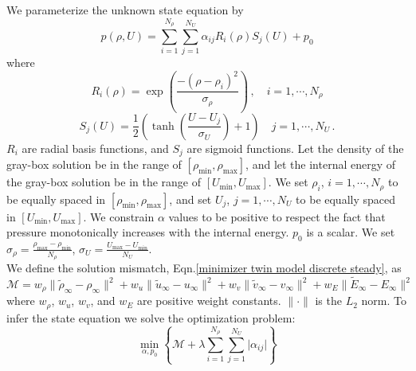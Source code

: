 \documentclass[a4paper,onecolumn]{article}
\theoremstyle{remark}
\begin{document}
\indent We parameterize the unknown state equation by
\begin{equation}
    p(\rho, U) = \sum_{i=1}^{N_\rho} \sum_{j=1}^{N_U} \alpha_{ij} R_i(\rho) S_j(U) 
    + p_0
    \label{parameterization}
\end{equation}
where
\begin{equation}
    R_i(\rho) = \exp\left(\frac{-(\rho-\rho_i)^2}{\sigma_\rho}\right)\,,\quad i=1,\cdots,N_\rho 
\end{equation}
\begin{equation}
    S_j(U) = \frac{1}{2}\left(\tanh\left( \frac{U-U_j}{\sigma_U}\right) +1\right)
    \quad j = 1,\cdots,N_U\,.
\end{equation}
$R_i$ are radial basis functions, and $S_j$ are sigmoid functions.
Let the density of the gray-box solution be in the range of $[\rho_{\min}, \rho_{\max}]$, and
let the internal energy of the gray-box solution be in the range of $[U_{\min}, U_{\max}]$.
We set $\rho_i$, $i=1,\cdots,N_\rho$ to be equally spaced in $[\rho_{\min}, \rho_{\max}]$, and set
$U_j$, $j=1,\cdots,N_U$ to be equally spaced in $[U_{\min}, U_{\max}]$.
We constrain $\alpha$ values to be positive to respect the fact that pressure
monotonically increases with the internal energy.
$p_0$ is a scalar. We set $\sigma_\rho=\frac{\rho_{\max}-\rho_{\min}}{N_\rho}$, 
$\sigma_U = \frac{U_{\max}-U_{\min}}{N_U}$.\\

\indent We define the solution mismatch, Eqn.\eqref{minimizer twin model discrete steady}, as
\begin{equation}
    \mathcal{M} = w_\rho \|\tilde{\rho}_{\infty} - \rho_{\infty}\|^2
                + w_u
                \|\tilde{u}_{\infty}- u_{\infty}\|^2
                + w_v
                \|\tilde{v}_{\infty}- v_{\infty}\|^2
                + w_E
                \|\tilde{E}_{\infty} - E_\infty\|^2
    \label{NS mismatch}
\end{equation}
where $w_\rho$, $w_u$, $w_v$, and $w_E$ are positive weight constants.
$\|\cdot\|$ is the $L_2$ norm.
To infer the state equation we solve the optimization problem:
\begin{equation}
    \min_{\alpha, p_0} \left\{\mathcal{M} +\lambda 
    \sum_{i=1}^{N_\rho}\sum_{j=1}^{N_U} \big|\alpha_{ij}\big|
    \right\}
    \label{NS optimize}
\end{equation}
\end{document}
